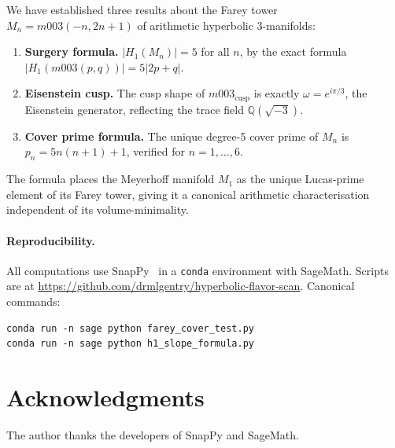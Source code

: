 \documentclass[11pt,a4paper]{article}
\theoremstyle{definition}
\newcommand{\QQ}{\mathbb{Q}}
\newcommand{\Mn}{M_n}
\newcommand{\Mcusp}{m003_{\mathrm{cusp}}}
\begin{document}
We have established three results about the Farey tower
$\Mn = m003(-n,2n+1)$ of arithmetic hyperbolic 3-manifolds:

\begin{enumerate}
\item \textbf{Surgery formula.} $|H_1(\Mn)| = 5$ for all $n$,
  by the exact formula $|H_1(m003(p,q))| = 5|2p+q|$.
\item \textbf{Eisenstein cusp.} The cusp shape of $\Mcusp$ is
  exactly $\omega = e^{i\pi/3}$, the Eisenstein generator,
  reflecting the trace field $\QQ(\sqrt{-3})$.
\item \textbf{Cover prime formula.} The unique degree-5
  cover prime of $\Mn$ is $p_n = 5n(n+1)+1$,
  verified for $n=1,\ldots,6$.
\end{enumerate}

The formula places the Meyerhoff manifold $M_1$ as the unique
Lucas-prime element of its Farey tower, giving it a canonical
arithmetic characterisation independent of its volume-minimality.

\paragraph{Reproducibility.}
All computations use SnapPy~\cite{SnapPy} in a \texttt{conda}
environment with SageMath.
Scripts are at
\url{https://github.com/drmlgentry/hyperbolic-flavor-scan}.
Canonical commands:
\begin{verbatim}
conda run -n sage python farey_cover_test.py
conda run -n sage python h1_slope_formula.py
\end{verbatim}

\section*{Acknowledgments}
The author thanks the developers of SnapPy and SageMath.
\end{document}
